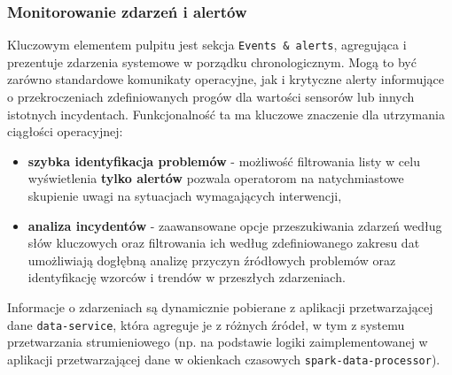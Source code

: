 \subsubsection{Monitorowanie zdarzeń i alertów}
Kluczowym elementem pulpitu jest sekcja \texttt{Events \& alerts}, agregująca i prezentuje zdarzenia systemowe w porządku chronologicznym. Mogą to być zarówno standardowe komunikaty operacyjne, jak i krytyczne alerty informujące o przekroczeniach zdefiniowanych progów dla wartości sensorów lub innych istotnych incydentach. Funkcjonalność ta ma kluczowe znaczenie dla utrzymania ciągłości operacyjnej:
\begin{itemize}
    \item \textbf{szybka identyfikacja problemów} - możliwość filtrowania listy w celu wyświetlenia \textbf{tylko alertów} pozwala operatorom na natychmiastowe skupienie uwagi na sytuacjach wymagających interwencji,
    \item \textbf{analiza incydentów} - zaawansowane opcje przeszukiwania zdarzeń według słów kluczowych oraz filtrowania ich według zdefiniowanego zakresu dat umożliwiają dogłębną analizę przyczyn źródłowych problemów oraz identyfikację wzorców i trendów w przeszłych zdarzeniach.
\end{itemize}
Informacje o zdarzeniach są dynamicznie pobierane z aplikacji przetwarzającej dane \texttt{data-service}, która agreguje je z różnych źródeł, w tym z systemu przetwarzania strumieniowego (np. na podstawie logiki zaimplementowanej w aplikacji przetwarzającej dane w okienkach czasowych \texttt{spark-data-processor}).

